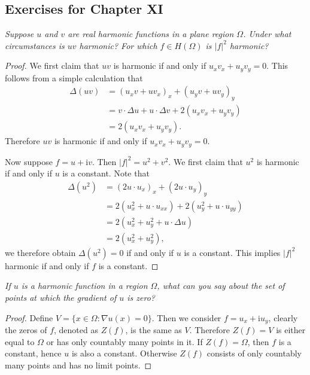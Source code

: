 \subsection{Exercises for Chapter XI}
\begin{problem}\em
Suppose $u$ and $v$ are real harmonic functions in a plane region $\Omega$. Under what circumstances is $uv$ harmonic? For which $f\in H(\Omega)$ is $|f|^2$ harmonic?
\end{problem}
\begin{proof}
We first claim that $uv$ is harmonic if and only if $u_xv_x+u_yv_y=0$. This follows from a simple calculation that 
$$
\begin{aligned}
\Delta \left( uv \right) &=\left( u_xv+uv_x \right) _x+\left( u_yv+uv_y \right) _y
\\
&=v\cdot \Delta u+u\cdot \Delta v+2\left( u_xv_x+u_yv_y \right) 
\\
&=2\left( u_xv_x+u_yv_y \right) .
\end{aligned}
$$
Therefore $uv$ is harmonic if and only if $u_xv_x+u_yv_y=0$.\par
Now suppose $f=u+\mathrm{i}v$. Then $|f|^2=u^2+v^2$. We first claim that $u^2$ is harmonic if and only if $u$ is a constant. Note that 
$$
\begin{aligned}
\Delta \left( u^2 \right) &=\left( 2u\cdot u_x \right) _x+\left( 2u\cdot u_y \right) _y
\\
&=2\left( u_{x}^{2}+u\cdot u_{xx} \right) +2\left( u_{y}^{2}+u\cdot u_{yy} \right) 
\\
&=2\left( u_{x}^{2}+u_{y}^{2}+u\cdot \Delta u \right) 
\\
&=2\left( u_{x}^{2}+u_{y}^{2} \right) ,
\end{aligned}
$$
we therefore obtain $\Delta(u^2)=0$ if and only if $u$ is a constant. This implies $|f|^2$ harmonic if and only if $f$ is a constant.
\end{proof}
\begin{problem}\em
If $u$ is a harmonic function in a region $\Omega$, what can you say about the set of points at which the gradient of $u$ is zero?
\end{problem}
\begin{proof}
Define $V=\{x\in\Omega:\nabla u(x)=0\}$. Then we consider $f=u_x+\mathrm{i}u_y$, clearly the zeros of $f$, denoted as $Z(f)$, is the same as $V$. Therefore $Z(f)=V$ is either equal to $\Omega$ or has only countably many points in it. If $Z(f)=\Omega$, then $f$ is a constant, hence $u$ is also a constant. Otherwise $Z(f)$ consists of only countably many points and has no limit points.
\end{proof}
